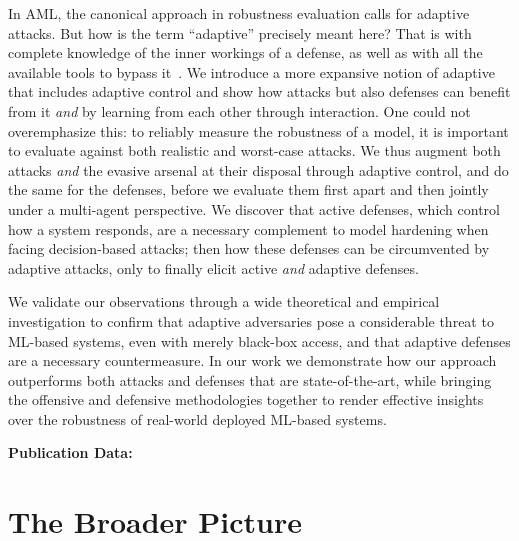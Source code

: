 In \gls{AML}, the canonical approach in robustness evaluation calls for adaptive attacks.
But how is the term ``adaptive'' precisely meant here?
That is with complete knowledge of the inner workings of a defense, as well as with all the available tools to bypass it~\cite{tramer2020adaptive}.
We introduce a more expansive notion of adaptive that includes adaptive control \cite{aastrom2013adaptive} and show how attacks but also defenses can benefit from it \emph{and} by learning from each other through interaction.
One could not overemphasize this: to reliably measure the robustness of a model, it is important to evaluate against both realistic and worst-case attacks.
We thus augment both attacks \emph{and} the evasive arsenal at their disposal through adaptive control, and do the same for the defenses, before we evaluate them first apart and then jointly under a multi-agent perspective.
We discover that active defenses, which control how a system responds, are a necessary complement to model hardening when facing decision-based attacks; then how these defenses can be circumvented by adaptive attacks, only to finally elicit active \emph{and} adaptive defenses.

We validate our observations through a wide theoretical and empirical investigation to confirm that adaptive adversaries pose a considerable threat to ML-based systems, even with merely black-box access, and that adaptive defenses are a necessary countermeasure.
In our work we demonstrate how our approach outperforms both attacks and defenses that are state-of-the-art, while bringing the offensive and defensive methodologies together to render effective insights over the robustness of real-world deployed ML-based systems.

\textbf{Publication Data:} 

\section{The Broader Picture}


